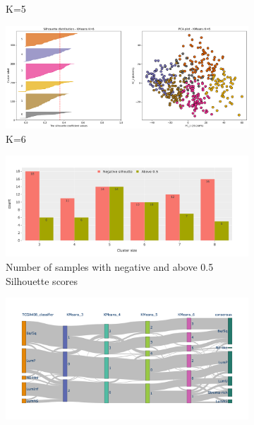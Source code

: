 \begin{figure}[H]
\begin{subfigure}[!t]{0.49\textwidth}
        \caption{K=5}
    \end{subfigure}
    \centering
    \begin{subfigure}[!t]{0.49\textwidth}
        \includegraphics[width=\textwidth]{Sections/ClusteringAnalysis/Resources/cs_top3/sill_distrib/KMeans_6_sill_distrib.png}
        \caption{K=6}
    \end{subfigure}
    \centering
    \begin{subfigure}[!t]{0.65\textwidth}
        \includegraphics[width=\textwidth, keepaspectratio]{Sections/ClusteringAnalysis/Resources/cs_top3/sill_distrib/sill_neg_above_th.png}
        \caption{Number of samples with negative and above 0.5 Silhouette scores}
    \end{subfigure}
    \centering
     \begin{subfigure}[!t]{0.65\textwidth}
        \includegraphics[width=\textwidth, keepaspectratio]{Sections/ClusteringAnalysis/Resources/cs_top3/sill_distrib/sky_kMeans.png}

\end{subfigure}
\end{figure}
